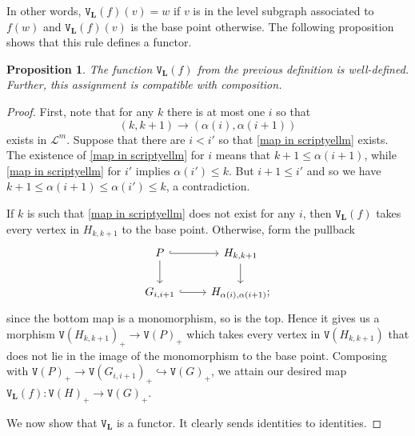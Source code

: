 \documentclass{amsart}
\numberwithin{theorem}{subsection}
\newtheorem{proposition}[theorem]{Proposition}
\theoremstyle{definition}
\newcommand{\levelg}{\mathbf{L}}
\newcommand{\vertex}{\mathtt{V}}
\newcommand{\scriptyell}{\mathscr L}
\begin{document}
In other words, $\vertex_{\levelg} (f) (v) = w$ if $v$ is in the level subgraph associated to $f(w)$ and $\vertex_{\levelg} (f) (v)$ is the base point otherwise.
The following proposition shows that this rule defines a functor.
\begin{proposition}
The function $\vertex_{\levelg} (f)$ from the previous definition is well-defined.
Further, this assignment is compatible with composition.
\end{proposition}
\begin{proof}
First, note that for any $k$ there is at most one $i$ so that
\begin{equation}\label{map in scriptyellm}
(k,k+1) \to (\alpha(i),\alpha(i+1))
\end{equation}
exists in $\scriptyell^m$.
Suppose that there are $i < i'$ so that \eqref{map in scriptyellm} exists.
The existence of \eqref{map in scriptyellm} for $i$ means that $k+1 \leq \alpha(i+1)$, while \eqref{map in scriptyellm} for $i'$ implies $\alpha(i') \leq k$.
But $i+1 \leq i'$ and so we have $k+1 \leq \alpha(i+1) \leq \alpha(i') \leq k$, a contradiction.

If $k$ is such that \eqref{map in scriptyellm} does not exist for any $i$, then $\vertex_\levelg(f)$ takes every vertex in $H_{k,k+1}$ to the base point.
Otherwise, form the pullback
\[
\begin{tikzcd}
P \rar[hook] \dar & H_{k,k+1} \dar \\
G_{i,i+1} \rar[hook] & H_{\alpha(i),\alpha(i+1)};
\end{tikzcd}
\]
since the bottom map is a monomorphism, so is the top. Hence it gives us a morphism $\vertex (H_{k,k+1})_+ \rightarrow \vertex(P)_+$ which takes every vertex in $\vertex (H_{k,k+1})$ that does not lie in the image of the monomorphism to the base point.
Composing with $\vertex(P)_+ \to \vertex(G_{i,i+1})_+ \hookrightarrow \vertex(G)_+$, we attain our desired map $\vertex_\levelg(f) \colon \vertex(H)_+ \rightarrow\vertex(G)_+$.

We now show that $\vertex_{\levelg}$ is a functor.
It clearly sends identities to identities.


\end{proof}
\end{document}
